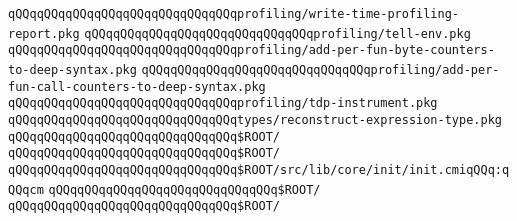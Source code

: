 \verb|qQQqqQQqqQQqqQQqqQQqqQQqqQQqqQQqprofiling/write-time-profiling-report.pkg|\newline
\verb|qQQqqQQqqQQqqQQqqQQqqQQqqQQqqQQqprofiling/tell-env.pkg|\newline
\verb|qQQqqQQqqQQqqQQqqQQqqQQqqQQqqQQqprofiling/add-per-fun-byte-counters-to-deep-syntax.pkg|\newline
\verb|qQQqqQQqqQQqqQQqqQQqqQQqqQQqqQQqprofiling/add-per-fun-call-counters-to-deep-syntax.pkg|\newline
\verb|qQQqqQQqqQQqqQQqqQQqqQQqqQQqqQQqprofiling/tdp-instrument.pkg|\newline
\newline
\verb|qQQqqQQqqQQqqQQqqQQqqQQqqQQqqQQqtypes/reconstruct-expression-type.pkg|\newline
\newline
\verb|qQQqqQQqqQQqqQQqqQQqqQQqqQQqqQQq$ROOT/|\newline
\verb|qQQqqQQqqQQqqQQqqQQqqQQqqQQqqQQq$ROOT/|\newline
\newline
\verb|qQQqqQQqqQQqqQQqqQQqqQQqqQQqqQQq$ROOT/src/lib/core/init/init.cmiqQQq:qQQqcm|\newline
\newline
\verb|qQQqqQQqqQQqqQQqqQQqqQQqqQQqqQQq$ROOT/|\newline
\newline
\verb|qQQqqQQqqQQqqQQqqQQqqQQqqQQqqQQq$ROOT/|\newline

